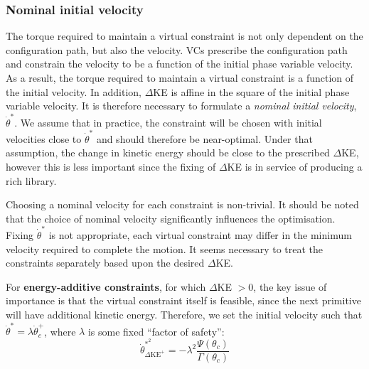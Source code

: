 \subsubsection{Nominal initial velocity}
The torque required to maintain a virtual constraint is not only dependent on the configuration path, but also the velocity. VCs prescribe the configuration path and constrain the velocity to be a function of the initial phase variable velocity. As a result, the torque required to maintain a virtual constraint is a function of the initial velocity. In addition, $\Delta$KE is affine in the square of the initial phase variable velocity. It is therefore necessary to formulate a \textit{nominal initial velocity}, $\dot{\theta}^*$. We assume that in practice, the constraint will be chosen with initial velocities close to $\dot{\theta}^*$ and should therefore be near-optimal. Under that assumption, the change in kinetic energy should be close to the prescribed $\Delta$KE, however this is less important since the fixing of $\Delta$KE is in service of producing a rich library.

Choosing a nominal velocity for each constraint is non-trivial. It should be noted that the choice of nominal velocity significantly influences the optimisation. Fixing $\dot{\theta}^*$ is not appropriate, each virtual constraint may differ in the minimum velocity required to complete the motion. It seems necessary to treat the constraints separately based upon the desired $\Delta$KE.

For \textbf{energy-additive constraints}, for which $\Delta$KE $>0$, the key issue of importance is that the virtual constraint itself is feasible, since the next primitive will have additional kinetic energy. Therefore, we set the initial velocity such that $\dot{\theta}^* = \lambda\dot{\theta}^+_c$, where $\lambda$ is some fixed ``factor of safety'':
\begin{equation} \label{eqn:energyadditive}
\dot{\theta}_{\Delta\mathrm{KE}^+}^{*^2} = -\lambda^2\frac{ \Psi(\theta_c)}{ \Gamma(\theta_c)}
\end{equation}

